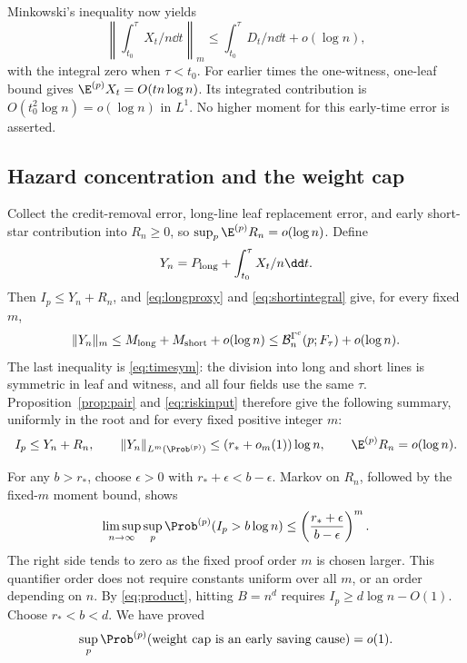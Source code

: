 Minkowski's inequality now yields
\begin{equation}\label{eq:shortintegral}
 \left\|\int_{t_0}^\tau X_t/n\dd t\right\|_m
 \le\int_{t_0}^\tau D_t/n\dd t+o(\log n),
\end{equation}
with the integral zero when \(\tau<t_0\).
For earlier times the one-witness, one-leaf bound gives
\(\E^{(p)}X_t=O(tn\log n)\). Its integrated contribution is
\(O(t_0^2\log n)=o(\log n)\) in \(L^1\). No higher moment for
this early-time error is asserted.

\subsection{Hazard concentration and the weight cap}
Collect the credit-removal error, long-line leaf replacement error,
and early short-star contribution into \(R_n\ge0\), so
\(\sup_p\E^{(p)}R_n=o(\log n)\). Define
\[
 Y_n=P_{\rm long}+\int_{t_0}^\tau X_t/n\dd t.
\]
Then \(I_p\le Y_n+R_n\), and \eqref{eq:longproxy} and
\eqref{eq:shortintegral} give, for every fixed \(m\),
\[
 \|Y_n\|_m\le M_{\rm long}+M_{\rm short}+o(\log n)
 \le\mathcal B_n^{\Gamma^c}(p;F_\tau)+o(\log n).
\]
The last inequality is \eqref{eq:timesym}: the division into long
and short lines is symmetric in leaf and witness, and all four
fields use the same \(\tau\).
Proposition~\ref{prop:pair} and \eqref{eq:riskinput} therefore give
the following summary, uniformly in the root and for every fixed
positive integer \(m\):
\begin{equation}\label{eq:hazarddecomp}
 I_p\le Y_n+R_n,\qquad
 \|Y_n\|_{L^m(\Prob^{(p)})}\le(r_*+o_m(1))\log n,
 \qquad \E^{(p)}R_n=o(\log n).
\end{equation}

For any \(b>r_*\), choose \(\epsilon>0\) with
\(r_*+\epsilon<b-\epsilon\). Markov on \(R_n\), followed by
the fixed-\(m\) moment bound, shows
\[
 \limsup_{n\to\infty}\sup_p\Prob^{(p)}(I_p>b\log n)
 \le\left(\frac{r_*+\epsilon}{b-\epsilon}\right)^m.
\]
The right side tends to zero as the fixed proof order \(m\) is
chosen larger. This quantifier order does not require constants
uniform over all \(m\), or an order depending on \(n\).
By \eqref{eq:product}, hitting \(B=n^d\) requires
\(I_p\ge d\log n-O(1)\). Choose \(r_*<b<d\). We have proved
\begin{equation}\label{eq:captail}
 \sup_p\Prob^{(p)}(\text{weight cap is an early saving cause})=o(1).
\end{equation}

